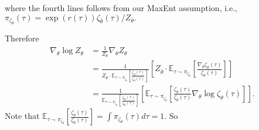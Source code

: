 where the fourth lines follows from our MaxEnt assumption, i.e., $\pi_{\zeta_{\bar{\theta}}}(\tau) = \exp(r(\tau))\zeta_{\bar{\theta}}(\tau)/Z_{\bar{\theta}}.$

Therefore
\begin{equation}
\begin{split}
	\nabla_\theta \log Z_\theta
	&= \frac{1}{Z_\theta} \nabla_\theta Z_\theta\\
	&= \frac{1}{Z_{\bar{\theta}}\cdot\mathbb{E}_{\tau \sim \pi_{\zeta_{\bar{\theta}}}} \left[\frac{\zeta_\theta(\tau)}{\zeta_{\bar{\theta}}(\tau)}\right]}\left[Z_{\bar{\theta}}\cdot\mathbb{E}_{\tau \sim \pi_{\zeta_{\bar{\theta}}}}\left[\frac{\nabla_\theta\zeta_\theta(\tau)}{\zeta_{\bar{\theta}}(\tau)}\right]\right]\\
	&= \frac{1}{\mathbb{E}_{\tau \sim \pi_{\zeta_{\bar{\theta}}}} \left[\frac{\zeta_\theta(\tau)}{\zeta_{\bar{\theta}}(\tau)}\right]}\left[\mathbb{E}_{\tau \sim \pi_{\zeta_{\bar{\theta}}}}\left[ \frac{\zeta_\theta(\tau)}{\zeta_{\bar{\theta}}(\tau)}\nabla_\theta \log \zeta_\theta(\tau)\right]\right].
\end{split}
\end{equation}
Note that $\mathbb{E}_{\tau \sim \pi_{\zeta_{\bar{\theta}}}}\left[\frac{\zeta_\theta(\tau)}{\zeta_{\bar{\theta}}(\tau)}\right] = \int \pi_{\zeta_\theta}(\tau) d\tau =1$. So
